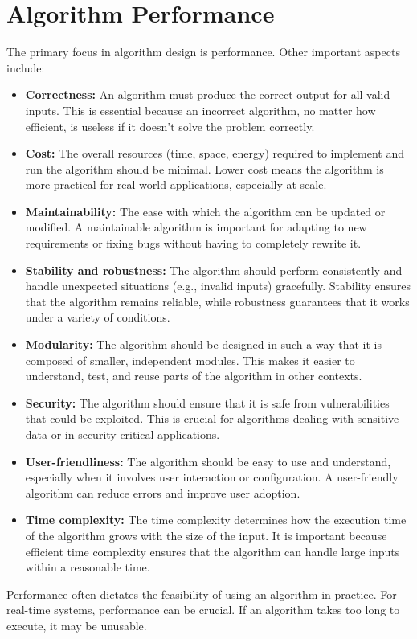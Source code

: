     \section{Algorithm Performance}
    The primary focus in algorithm design is performance. Other important aspects include:
    \begin{itemize}
        \item \textbf{Correctness:} An algorithm must produce the correct output for all valid inputs. This is essential because an incorrect algorithm, no matter how efficient, is useless if it doesn't solve the problem correctly.
    
        \item \textbf{Cost:} The overall resources (time, space, energy) required to implement and run the algorithm should be minimal. Lower cost means the algorithm is more practical for real-world applications, especially at scale.
    
        \item \textbf{Maintainability:} The ease with which the algorithm can be updated or modified. A maintainable algorithm is important for adapting to new requirements or fixing bugs without having to completely rewrite it.
    
        \item \textbf{Stability and robustness:} The algorithm should perform consistently and handle unexpected situations (e.g., invalid inputs) gracefully. Stability ensures that the algorithm remains reliable, while robustness guarantees that it works under a variety of conditions.
    
        \item \textbf{Modularity:} The algorithm should be designed in such a way that it is composed of smaller, independent modules. This makes it easier to understand, test, and reuse parts of the algorithm in other contexts.
    
        \item \textbf{Security:} The algorithm should ensure that it is safe from vulnerabilities that could be exploited. This is crucial for algorithms dealing with sensitive data or in security-critical applications.
    
        \item \textbf{User-friendliness:} The algorithm should be easy to use and understand, especially when it involves user interaction or configuration. A user-friendly algorithm can reduce errors and improve user adoption.
    
        \item \textbf{Time complexity:} The time complexity determines how the execution time of the algorithm grows with the size of the input. It is important because efficient time complexity ensures that the algorithm can handle large inputs within a reasonable time.
    \end{itemize}
    Performance often dictates the feasibility of using an algorithm in practice. For real-time systems, performance can be crucial. If an algorithm takes too long to execute, it may be unusable.
    
